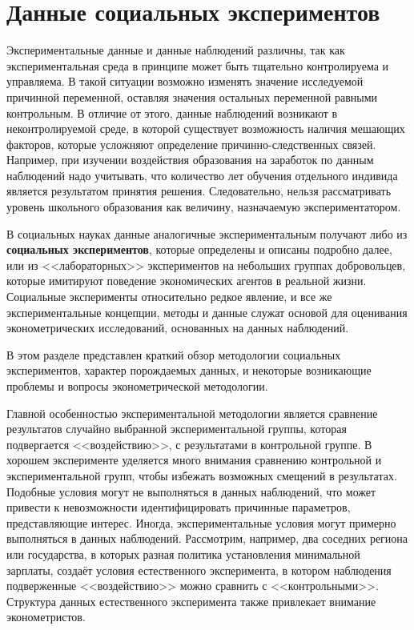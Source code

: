 \section{Данные социальных экспериментов}

Экспериментальные данные и данные наблюдений различны, так как экспериментальная среда в принципе может быть тщательно контролируема и управляема. В такой ситуации возможно изменять значение исследуемой причинной переменной, оставляя значения остальных переменной равными контрольным. В отличие от этого, данные наблюдений возникают  в неконтролируемой среде, в которой существует возможность наличия мешающих факторов, которые усложняют определение причинно-следственных связей. Например, при изучении воздействия образования на  заработок по данным наблюдений надо учитывать, что количество лет обучения отдельного индивида является результатом принятия решения.  Следовательно, нельзя рассматривать уровень школьного образования как величину, назначаемую экспериментатором.


В социальных науках данные аналогичные экспериментальным получают либо из  \textbf{социальных экспериментов}, которые определены и описаны подробно далее, или из  <<лабораторных>> экспериментов на небольших группах добровольцев, которые имитируют поведение экономических агентов в реальной жизни. Социальные эксперименты относительно редкое явление, и все же экспериментальные концепции, методы и данные служат основой для оценивания эконометрических исследований, основанных на данных наблюдений.


В этом разделе представлен краткий обзор методологии социальных экспериментов, характер  порождаемых данных, и некоторые возникающие проблемы и вопросы эконометрической методологии.


Главной особенностью экспериментальной методологии является сравнение  результатов случайно выбранной экспериментальной группы, которая подвергается <<воздействию>>, с результатами в контрольной группе. 
В хорошем эксперименте уделяется много внимания сравнению контрольной и экспериментальной групп, чтобы избежать возможных смещений в результатах. 
Подобные условия могут не выполняться в данных наблюдений, что может привести к невозможности идентифицировать причинные параметров, представляющие интерес. 
Иногда, экспериментальные условия могут примерно выполняться в данных наблюдений. Рассмотрим, например, два соседних региона или государства, в которых разная политика установления минимальной зарплаты, создаёт условия естественного эксперимента, в котором наблюдения подверженные <<воздействию>> можно сравнить с  <<контрольными>>. Структура данных естественного эксперимента также привлекает внимание эконометристов.


